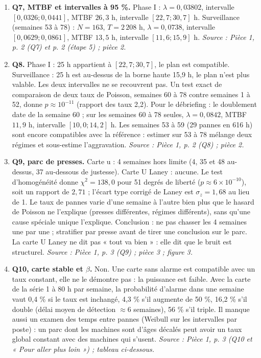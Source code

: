 \documentclass[10pt,a4paper]{article}
\newcommand{\src}[1]{{\footnotesize\color{uimm}\textit{Source : #1}}}
\begin{document}
\begin{enumerate}[label=\textcolor{cyan}{\textbf{Q\arabic*.}},leftmargin=22pt,itemsep=5pt]
\item \textbf{Q7, MTBF et intervalles à 95 \%.} Phase I : $\lambda = 0{,}03802$, intervalle $[0{,}0326 ; 0{,}0441]$, MTBF $26{,}3$ h, intervalle $[22{,}7 ; 30{,}7]$ h. Surveillance (semaines 53 à 78) : $N = 163$, $T = 2\,208$ h, $\lambda = 0{,}0738$, intervalle $[0{,}0629 ; 0{,}0861]$, MTBF $13{,}5$ h, intervalle $[11{,}6 ; 15{,}9]$ h. \src{Pièce 1, p. 2 (Q7) et p. 2 (étape 5) ; pièce 2.}
\item \textbf{Q8.} Phase I : 25 h appartient à $[22{,}7 ; 30{,}7]$, le plan est compatible. Surveillance : 25 h est au-dessus de la borne haute 15,9 h, le plan n'est plus valable. Les deux intervalles ne se recouvrent pas. Un test exact de comparaison de deux taux de Poisson, semaines 60 à 78 contre semaines 1 à 52, donne $p \approx 10^{-11}$ (rapport des taux 2,2). Pour le débriefing : le doublement date de la semaine 60 ; sur les semaines 60 à 78 seules, $\lambda = 0{,}0842$, MTBF $11{,}9$ h, intervalle $[10{,}0 ; 14{,}2]$ h. Les semaines 53 à 59 (29 pannes en 616 h) sont encore compatibles avec la référence : estimer sur 53 à 78 mélange deux régimes et sous-estime l'aggravation. \src{Pièce 1, p. 2 (Q8) ; pièce 2.}
\item \textbf{Q9, parc de presses.} Carte u : 4 semaines hors limite (4, 35 et 48 au-dessus, 37 au-dessous de justesse). Carte U Laney : aucune. Le test d'homogénéité donne $\chi^2 = 138{,}0$ pour 51 degrés de liberté ($p \approx 6 \times 10^{-10}$), soit un rapport de $2{,}71$ ; l'écart type corrigé de Laney est $\sigma_z = 1{,}68$ au lieu de 1. Le taux de pannes varie d'une semaine à l'autre bien plus que le hasard de Poisson ne l'explique (presses différentes, régimes différents), sans qu'une cause spéciale unique l'explique. Conclusion : ne pas chasser les 4 semaines une par une ; stratifier par presse avant de tirer une conclusion sur le parc. La carte U Laney ne dit pas « tout va bien » : elle dit que le bruit est structurel. \src{Pièce 1, p. 3 (Q9) ; pièce 3 ; figure 3.}
\item \textbf{Q10, carte stable et $\beta$.} Non. Une carte sans alarme est compatible avec un taux constant, elle ne le démontre pas : la puissance est faible. Avec la carte de la série 1 à 80 h par semaine, la probabilité d'alarme dans une semaine vaut 0,4 \% si le taux est inchangé, 4,3 \% s'il augmente de 50 \%, 16,2 \% s'il double (délai moyen de détection $\approx 6$ semaines), 56 \% s'il triple. Il manque aussi un examen des temps entre pannes (Weibull sur les intervalles par poste) : un parc dont les machines sont d'âges décalés peut avoir un taux global constant avec des machines qui s'usent. \src{Pièce 1, p. 3 (Q10 et « Pour aller plus loin ») ; tableau ci-dessous.}
\end{enumerate}
\end{document}
